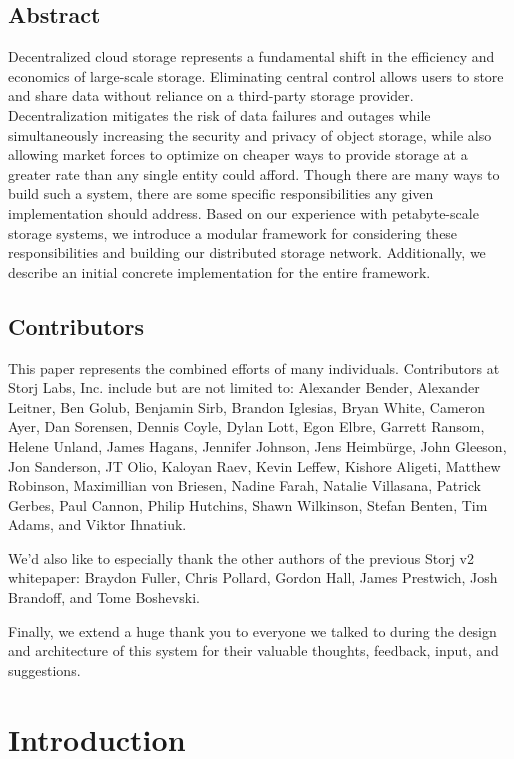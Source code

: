 \documentclass[11pt,fleqn,openany]{book}
\begin{document}
\tableofcontents\newpage

\section{Abstract}

Decentralized cloud storage represents a fundamental shift in
the efficiency and economics of large-scale storage.
Eliminating central control allows users to store and share data
without reliance on a third-party storage provider. Decentralization mitigates
the risk of data failures and outages while simultaneously increasing
the security and privacy of object storage, while also
allowing market forces to optimize on cheaper ways to
provide storage at a greater rate than any single entity could afford.
Though there are many ways to build such a system, there are some specific
responsibilities any given implementation should address.
Based on our experience with petabyte-scale
storage systems, we introduce a modular framework for considering these
responsibilities and building our distributed storage network.
Additionally, we describe an initial
concrete implementation for the entire framework.

\section{Contributors}

This paper represents the combined efforts of many individuals.
Contributors at Storj Labs, Inc. include but are not limited to:
Alexander Bender,
Alexander Leitner,
Ben Golub,
Benjamin Sirb,
Brandon Iglesias,
Bryan White,
Cameron Ayer,
Dan Sorensen,
Dennis Coyle,
Dylan Lott,
Egon Elbre,
Garrett Ransom,
Helene Unland,
James Hagans,
Jennifer Johnson,
Jens Heimbürge,
John Gleeson,
Jon Sanderson,
JT Olio,
Kaloyan Raev,
Kevin Leffew,
Kishore Aligeti,
Matthew Robinson,
Maximillian von Briesen,
Nadine Farah,
Natalie Villasana,
Patrick Gerbes,
Paul Cannon,
Philip Hutchins,
Shawn Wilkinson,
Stefan Benten,
Tim Adams,
and Viktor Ihnatiuk.

We'd also like to especially thank the other authors of the previous
Storj v2 whitepaper:
Braydon Fuller,
Chris Pollard,
Gordon Hall,
James Prestwich,
Josh Brandoff,
and Tome Boshevski.

Finally, we extend a huge thank you to everyone we talked to during the
design and architecture of this system for their valuable thoughts, feedback,
input, and suggestions.

\chapter{Introduction}
\end{document}
